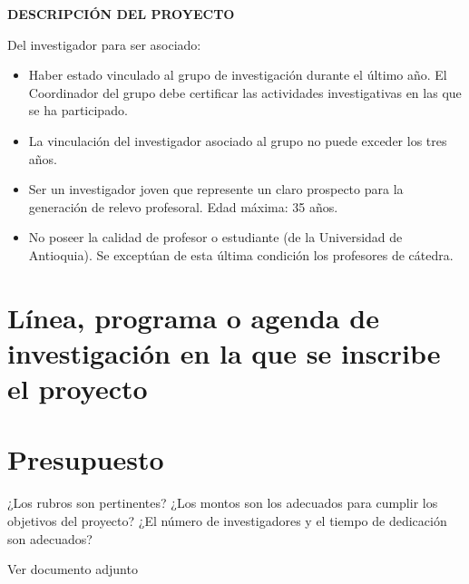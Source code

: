 \documentclass[11pt]{article}
\begin{document}
\begin{center}
  \textbf{\large DESCRIPCIÓN DEL PROYECTO}
\end{center}

\begin{instrucciones}
  Del investigador para ser asociado:
  \begin{itemize}
  \item  Haber estado vinculado al grupo de investigación durante el último año. El Coordinador del grupo debe certificar las actividades investigativas en las que se ha participado.

  \item La vinculación del investigador asociado al grupo no puede exceder los tres años.

  \item Ser un investigador joven que represente un claro prospecto para la generación de relevo profesoral. Edad máxima: 35 años.

  \item No poseer la calidad de profesor o estudiante (de la Universidad de Antioquia). Se exceptúan de esta última condición los profesores de cátedra.
  \end{itemize}
\end{instrucciones}


\section{Línea, programa o agenda de investigación en la que se inscribe el proyecto}











\section{ Presupuesto}
\begin{instrucciones}
  ¿Los rubros son pertinentes? ¿Los montos son los adecuados para cumplir los objetivos del proyecto? ¿El número de investigadores y el tiempo de dedicación son adecuados?
\end{instrucciones}
Ver documento adjunto 


\end{document}
